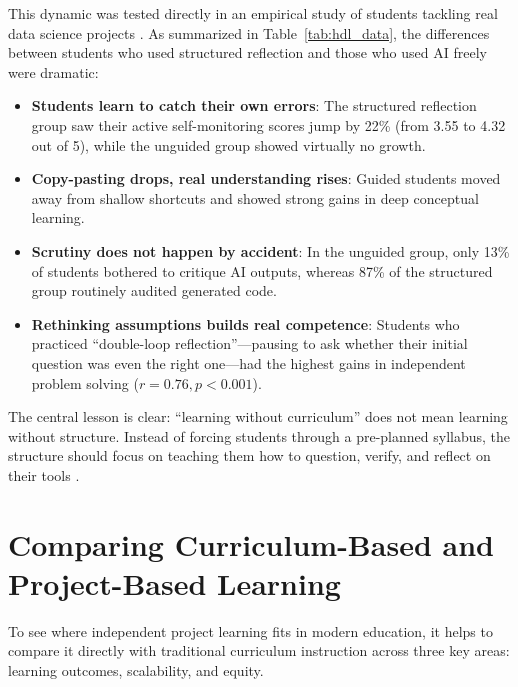 \documentclass[11pt]{article}
\begin{document}
This dynamic was tested directly in an empirical study of students tackling real data science projects \citep{song2026heutagogy}. As summarized in Table~\ref{tab:hdl_data}, the differences between students who used structured reflection and those who used AI freely were dramatic:
\begin{itemize}
\item \textbf{Students learn to catch their own errors}: The structured reflection group saw their active self-monitoring scores jump by 22\% (from 3.55 to 4.32 out of 5), while the unguided group showed virtually no growth.
\item \textbf{Copy-pasting drops, real understanding rises}: Guided students moved away from shallow shortcuts and showed strong gains in deep conceptual learning.
\item \textbf{Scrutiny does not happen by accident}: In the unguided group, only 13\% of students bothered to critique AI outputs, whereas 87\% of the structured group routinely audited generated code.
\item \textbf{Rethinking assumptions builds real competence}: Students who practiced ``double-loop reflection''---pausing to ask whether their initial question was even the right one---had the highest gains in independent problem solving ($r = 0.76, p < 0.001$).
\end{itemize}

The central lesson is clear: ``learning without curriculum'' does not mean learning without structure. Instead of forcing students through a pre-planned syllabus, the structure should focus on teaching them how to question, verify, and reflect on their tools \citep{song2026heutagogy}.

\section{Comparing Curriculum-Based and Project-Based Learning}

To see where independent project learning fits in modern education, it helps to compare it directly with traditional curriculum instruction across three key areas: learning outcomes, scalability, and equity.
\end{document}
